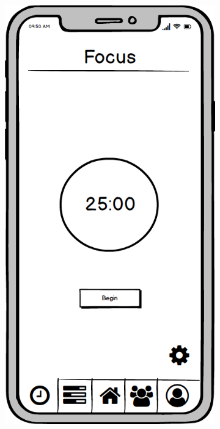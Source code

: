 \begin{figure}
\begin{subfigure}[b]{0.3\textwidth}
        \label{fig:add_item}
    \end{subfigure}
    \hfill
    \begin{subfigure}[b]{0.3\textwidth}
        \centering
        \includegraphics[width=\textwidth]{./graphics/design/Focus.png}

\end{subfigure}
\end{figure}
